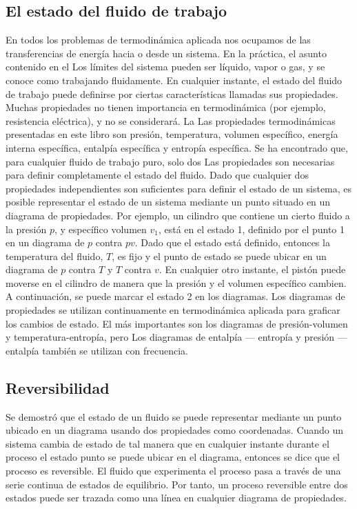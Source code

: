 \subsection{El estado del fluido de trabajo}

En todos los problemas de termodinámica aplicada nos ocupamos de las transferencias de energía
hacia o desde un sistema. En la práctica, el asunto contenido en el
Los límites del sistema pueden ser líquido, vapor o gas, y se conoce como
trabajando fluidamente. En cualquier instante, el estado del fluido de trabajo puede definirse por
ciertas características llamadas sus propiedades. Muchas propiedades no tienen importancia
en termodinámica (por ejemplo, resistencia eléctrica), y no se considerará. La
Las propiedades termodinámicas presentadas en este libro son presión, temperatura,
volumen específico, energía interna específica, entalpía específica y entropía específica.
Se ha encontrado que, para cualquier fluido de trabajo puro, solo dos
Las propiedades son necesarias para definir completamente el estado del fluido. Dado que cualquier
dos propiedades independientes son suficientes para definir el estado de un sistema, es posible
representar el estado de un sistema mediante un punto situado en un diagrama de propiedades.
Por ejemplo, un cilindro que contiene un cierto fluido a la presión $p$, y específico
volumen $v_1$, está en el estado 1, definido por el punto 1 en un diagrama de $p$ contra $pv$. 
Dado que el estado está definido, entonces la temperatura del fluido, $T$, es
fijo y el punto de estado se puede ubicar en un diagrama de $p$ contra $T$ y $T$
contra $v$. En cualquier otro instante, el pistón puede
moverse en el cilindro de manera que la presión y el volumen específico cambien.
A continuación, se puede marcar el estado 2 en los diagramas. Los diagramas de propiedades se utilizan continuamente en termodinámica aplicada para graficar los cambios de estado. El más importantes son los diagramas de presión-volumen y temperatura-entropía, pero
Los diagramas de entalpía — entropía y presión — entalpía también se utilizan con frecuencia.

\subsection{Reversibilidad}

Se demostró que el estado de un fluido se puede representar mediante un
punto ubicado en un diagrama usando dos propiedades como coordenadas. Cuando un sistema
cambia de estado de tal manera que en cualquier instante durante el proceso el estado
punto se puede ubicar en el diagrama, entonces se dice que el proceso es reversible.
El fluido que experimenta el proceso pasa a través de una serie continua de
estados de equilibrio. Por tanto, un proceso reversible entre dos estados puede ser
trazada como una línea en cualquier diagrama de propiedades. 

